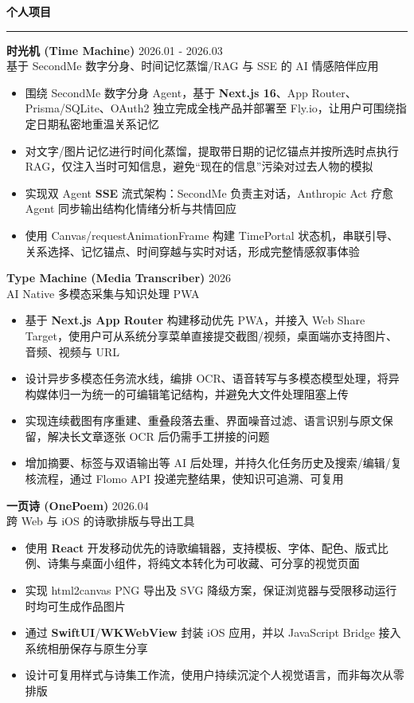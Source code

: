 \documentclass[10pt,a4paper]{article}
\begin{document}
\vspace{1em}

\noindent\textbf{个人项目}\\[-0.2em]
\rule{\textwidth}{1pt}
\textbf{时光机 (Time Machine)} \hfill 2026.01 - 2026.03\\
基于 SecondMe 数字分身、时间记忆蒸馏/RAG 与 SSE 的 AI 情感陪伴应用\vspace{-8pt}
\begin{itemize}[noitemsep]
    \item 围绕 SecondMe 数字分身 Agent，基于 \textbf{Next.js 16}、App Router、Prisma/SQLite、OAuth2 独立完成全栈产品并部署至 Fly.io，让用户可围绕指定日期私密地重温关系记忆
    \item 对文字/图片记忆进行时间化蒸馏，提取带日期的记忆锚点并按所选时点执行 RAG，仅注入当时可知信息，避免“现在的信息”污染对过去人物的模拟
    \item 实现双 Agent \textbf{SSE} 流式架构：SecondMe 负责主对话，Anthropic Act 疗愈 Agent 同步输出结构化情绪分析与共情回应
    \item 使用 Canvas/requestAnimationFrame 构建 TimePortal 状态机，串联引导、关系选择、记忆锚点、时间穿越与实时对话，形成完整情感叙事体验
\end{itemize}

\noindent\textbf{Type Machine (Media Transcriber)} \hfill 2026\\
AI Native 多模态采集与知识处理 PWA\vspace{-8pt}
\begin{itemize}[noitemsep]
    \item 基于 \textbf{Next.js App Router} 构建移动优先 PWA，并接入 Web Share Target，使用户可从系统分享菜单直接提交截图/视频，桌面端亦支持图片、音频、视频与 URL
    \item 设计异步多模态任务流水线，编排 OCR、语音转写与多模态模型处理，将异构媒体归一为统一的可编辑笔记结构，并避免大文件处理阻塞上传
    \item 实现连续截图有序重建、重叠段落去重、界面噪音过滤、语言识别与原文保留，解决长文章逐张 OCR 后仍需手工拼接的问题
    \item 增加摘要、标签与双语输出等 AI 后处理，并持久化任务历史及搜索/编辑/复核流程，通过 Flomo API 投递完整结果，使知识可追溯、可复用
\end{itemize}

\noindent\textbf{一页诗 (OnePoem)} \hfill 2026.04\\
跨 Web 与 iOS 的诗歌排版与导出工具\vspace{-8pt}
\begin{itemize}[noitemsep]
    \item 使用 \textbf{React} 开发移动优先的诗歌编辑器，支持模板、字体、配色、版式比例、诗集与桌面小组件，将纯文本转化为可收藏、可分享的视觉页面
    \item 实现 html2canvas PNG 导出及 SVG 降级方案，保证浏览器与受限移动运行时均可生成作品图片
    \item 通过 \textbf{SwiftUI}/\textbf{WKWebView} 封装 iOS 应用，并以 JavaScript Bridge 接入系统相册保存与原生分享
    \item 设计可复用样式与诗集工作流，使用户持续沉淀个人视觉语言，而非每次从零排版
\end{itemize}
\end{document}
